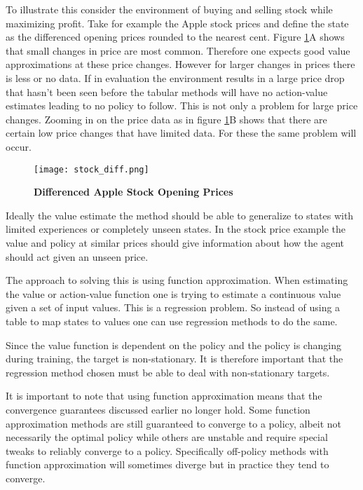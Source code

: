 To illustrate this consider the environment of buying and selling stock while maximizing profit. Take for example the Apple stock prices and define the state as the differenced opening prices rounded to the nearest cent. Figure \ref{fig:stock_diff}A shows that small changes in price are most common. Therefore one expects good value approximations at these price changes. However for larger changes in prices there is less or no data. If in evaluation the environment results in a large price drop that hasn't been seen before the tabular methods will have no action-value estimates leading to no policy to follow. This is not only a problem for large price changes. Zooming in on the price data as in figure \ref{fig:stock_diff}B shows that there are certain low price changes that have limited data. For these the same problem will occur.

\begin{figure}[H] %
    \texttt{[image: stock\_diff.png]}
    \caption{\textbf{Differenced Apple Stock Opening Prices}}
    \label{fig:stock_diff}
\end{figure}

Ideally the value estimate the method should be able to generalize to states with limited experiences or completely unseen states. In the stock price example the value and policy at similar prices should give information about how the agent should act given an unseen price. 

The approach to solving this is using function approximation. When estimating the value or action-value function one is trying to estimate a continuous value given a set of input values. This is a regression problem. So instead of using a table to map states to values one can use regression methods to do the same. 

Since the value function is dependent on the policy and the policy is changing during training, the target is non-stationary. It is therefore important that the regression method chosen must be able to deal with non-stationary targets.\cite[p.~198-199]{sutton_barto_2018}

It is important to note that using function approximation means that the convergence guarantees discussed earlier no longer hold. Some function approximation methods are still guaranteed to converge to a policy, albeit not necessarily the optimal policy while others are unstable and require special tweaks to reliably converge to a policy. Specifically off-policy methods with function approximation will sometimes diverge but in practice they tend to converge\citep[p~.258]{sutton_barto_2018}.

